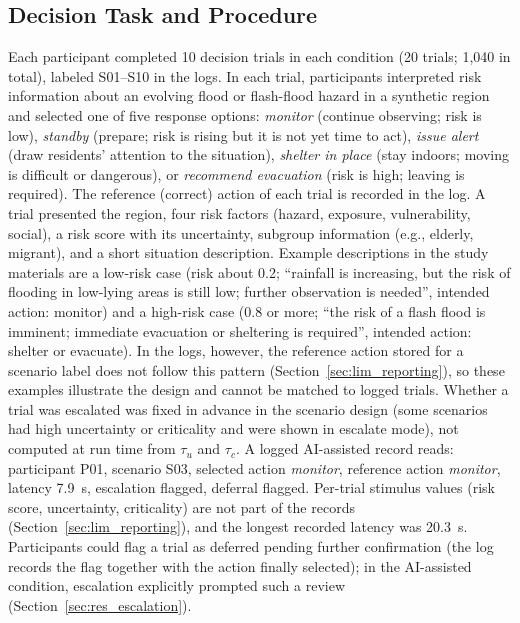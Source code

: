 \documentclass[journal]{IEEEtran}
\theoremstyle{plain}
\theoremstyle{definition}
\begin{document}
    \subsection{Decision Task and Procedure}
    \label{sec:task}

    Each participant completed 10 decision trials in each condition (20 trials; 1,040 in total), labeled S01--S10 in the logs. In each trial, participants interpreted risk information about an evolving flood or flash-flood hazard in a synthetic region and selected one of five response options: \emph{monitor} (continue observing; risk is low), \emph{standby} (prepare; risk is rising but it is not yet time to act), \emph{issue alert} (draw residents' attention to the situation), \emph{shelter in place} (stay indoors; moving is difficult or dangerous), or \emph{recommend evacuation} (risk is high; leaving is required). The reference (correct) action of each trial is recorded in the log. A trial presented the region, four risk factors (hazard, exposure, vulnerability, social), a risk score with its uncertainty, subgroup information (e.g., elderly, migrant), and a short situation description. Example descriptions in the study materials are a low-risk case (risk about 0.2; ``rainfall is increasing, but the risk of flooding in low-lying areas is still low; further observation is needed'', intended action: monitor) and a high-risk case (0.8 or more; ``the risk of a flash flood is imminent; immediate evacuation or sheltering is required'', intended action: shelter or evacuate). In the logs, however, the reference action stored for a scenario label does not follow this pattern (Section~\ref{sec:lim_reporting}), so these examples illustrate the design and cannot be matched to logged trials. Whether a trial was escalated was fixed in advance in the scenario design (some scenarios had high uncertainty or criticality and were shown in escalate mode), not computed at run time from $\tau_u$ and $\tau_c$. A logged AI-assisted record reads: participant P01, scenario S03, selected action \emph{monitor}, reference action \emph{monitor}, latency 7.9~s, escalation flagged, deferral flagged. Per-trial stimulus values (risk score, uncertainty, criticality) are not part of the records (Section~\ref{sec:lim_reporting}), and the longest recorded latency was 20.3~s. Participants could flag a trial as deferred pending further confirmation (the log records the flag together with the action finally selected); in the AI-assisted condition, escalation explicitly prompted such a review (Section~\ref{sec:res_escalation}).
\end{document}
